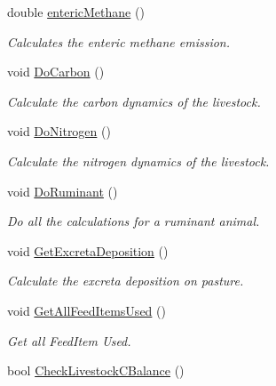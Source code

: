 \begin{DoxyCompactItemize}
double \mbox{\hyperlink{classlivestock_afc3c7bb93fede893404fb7d5d8daa0e3}{enteric\+Methane}} ()
\begin{DoxyCompactList}\small\item\em Calculates the enteric methane emission. \end{DoxyCompactList}\item 
\mbox{\label{classlivestock_abe11bf02d5a63a5411eb52c8745bdf5c}} 
void \mbox{\hyperlink{classlivestock_abe11bf02d5a63a5411eb52c8745bdf5c}{Do\+Carbon}} ()
\begin{DoxyCompactList}\small\item\em Calculate the carbon dynamics of the livestock. \end{DoxyCompactList}\item 
\mbox{\label{classlivestock_ac4347842c79f5017c56d3d1dd2ab4d53}} 
void \mbox{\hyperlink{classlivestock_ac4347842c79f5017c56d3d1dd2ab4d53}{Do\+Nitrogen}} ()
\begin{DoxyCompactList}\small\item\em Calculate the nitrogen dynamics of the livestock. \end{DoxyCompactList}\item 
void \mbox{\hyperlink{classlivestock_aae915d09f0a2e9cb020a6fb59335437a}{Do\+Ruminant}} ()
\begin{DoxyCompactList}\small\item\em Do all the calculations for a ruminant animal. \end{DoxyCompactList}\item 
\mbox{\label{classlivestock_a856d571b94958d5dddf73d7f456f39e2}} 
void \mbox{\hyperlink{classlivestock_a856d571b94958d5dddf73d7f456f39e2}{Get\+Excreta\+Deposition}} ()
\begin{DoxyCompactList}\small\item\em Calculate the excreta deposition on pasture. \end{DoxyCompactList}\item 
void \mbox{\hyperlink{classlivestock_a4c32851ffda591d69f9c5d6914cb6150}{Get\+All\+Feed\+Items\+Used}} ()
\begin{DoxyCompactList}\small\item\em Get all Feed\+Item Used. \end{DoxyCompactList}\item 
bool \mbox{\hyperlink{classlivestock_a4c255fb9cb3d61f425e85e4b7c1cbbbb}{Check\+Livestock\+C\+Balance}} ()

\end{DoxyCompactItemize}
